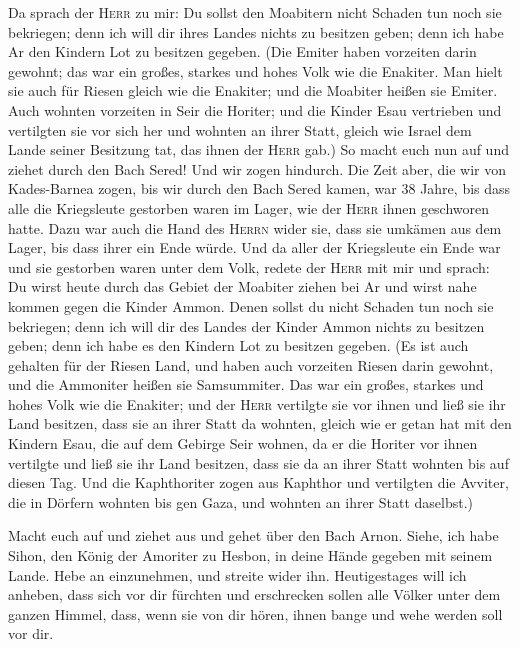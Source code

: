  Da sprach der \textsc{Herr} zu mir: Du sollst den
Moabitern nicht Schaden tun noch sie bekriegen; denn ich will dir ihres
Landes nichts zu besitzen geben; denn ich habe Ar den Kindern Lot zu
besitzen gegeben.  (Die Emiter haben vorzeiten darin
gewohnt; das war ein großes, starkes und hohes Volk wie die Enakiter.
 Man hielt sie auch für Riesen gleich wie die Enakiter;
und die Moabiter heißen sie Emiter.  Auch wohnten
vorzeiten in Seir die Horiter; und die Kinder Esau vertrieben und
vertilgten sie vor sich her und wohnten an ihrer Statt, gleich wie
Israel dem Lande seiner Besitzung tat, das ihnen der \textsc{Herr} gab.)
 So macht euch nun auf und ziehet durch den Bach Sered!
Und wir zogen hindurch.  Die Zeit aber, die wir von
Kades-Barnea zogen, bis wir durch den Bach Sered kamen, war 38 Jahre,
bis dass alle die Kriegsleute gestorben waren im Lager, wie der
\textsc{Herr} ihnen geschworen hatte.  Dazu war auch die
Hand des \textsc{Herrn} wider sie, dass sie umkämen aus dem Lager, bis
dass ihrer ein Ende würde.  Und da aller der Kriegsleute
ein Ende war und sie gestorben waren unter dem Volk, 
redete der \textsc{Herr} mit mir und sprach:  Du wirst
heute durch das Gebiet der Moabiter ziehen bei Ar  und
wirst nahe kommen gegen die Kinder Ammon. Denen sollst du nicht Schaden
tun noch sie bekriegen; denn ich will dir des Landes der Kinder Ammon
nichts zu besitzen geben; denn ich habe es den Kindern Lot zu besitzen
gegeben.  (Es ist auch gehalten für der Riesen Land, und
haben auch vorzeiten Riesen darin gewohnt, und die Ammoniter heißen sie
Samsummiter.  Das war ein großes, starkes und hohes Volk
wie die Enakiter; und der \textsc{Herr} vertilgte sie vor ihnen und ließ
sie ihr Land besitzen, dass sie an ihrer Statt da wohnten,
 gleich wie er getan hat mit den Kindern Esau, die auf
dem Gebirge Seir wohnen, da er die Horiter vor ihnen vertilgte und ließ
sie ihr Land besitzen, dass sie da an ihrer Statt wohnten bis auf diesen
Tag.  Und die Kaphthoriter zogen aus Kaphthor und
vertilgten die Avviter, die in Dörfern wohnten bis gen Gaza, und wohnten
an ihrer Statt daselbst.)

 Macht euch auf und ziehet aus und gehet über den Bach
Arnon. Siehe, ich habe Sihon, den König der Amoriter zu Hesbon, in deine
Hände gegeben mit seinem Lande. Hebe an einzunehmen, und streite wider
ihn.  Heutigestages will ich anheben, dass sich vor dir
fürchten und erschrecken sollen alle Völker unter dem ganzen Himmel,
dass, wenn sie von dir hören, ihnen bange und wehe werden soll vor dir.

